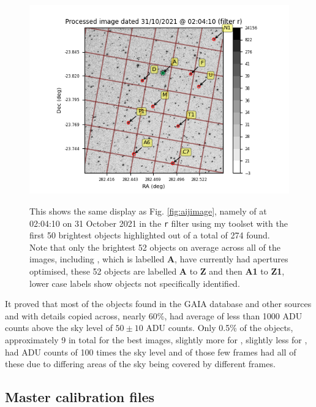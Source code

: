 \begin{figure}[!htbp]
\begin{center}
\includegraphics[scale=0.80]{images/myimage.png} \\
\vspace{-.5cm}
\end{center}
\caption{This shows the same display as Fig. \ref{fig:aijimage}, namely of
{\ross} at 02:04:10 on 31 October 2021 in the \texttt{r} filter using my
toolset with the first 50 brightest objects highlighted out of a total of 274
found. Note that only the brightest 52 objects on average across all of the
images, including \ross, which is labelled \textbf{A}, have currently had
apertures optimised, these 52 objects are labelled \textbf{A} to \textbf{Z}
and then \textbf{A1} to \textbf{Z1}, lower case labels show objects not
specifically identified.}
\protect\label{fig:myimage}
\end{figure}

It proved that most of the objects found in the GAIA database and other sources
and with details copied across, nearly 60\%, had average of less than 1000 ADU
counts above the sky level of $50 \pm 10$ ADU counts. Only 0.5\% of the objects,
approximately 9 in total for the best {\ross} images, slightly more for \prox,
slightly less for \bstar, had ADU counts of 100 times the sky level and of those
few frames had all of these due to differing areas of the sky being covered by
different frames.

\subsection{Master calibration files}
\protect\label{section:masterbiasflat}


